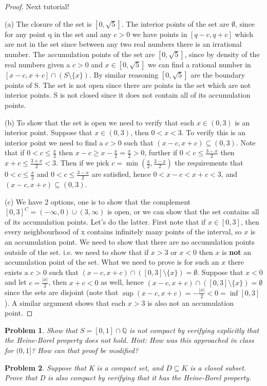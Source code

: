 \documentclass[11pt]{article}
\theoremstyle{plain}
\newtheorem{problem}{Problem}
\theoremstyle{remark}
\newcommand {\mbQ} {\mathbb Q}
\begin{document}
	\begin{proof}
		
		Next tutorial!
		
	
		(a) The closure of the set is $[0, \sqrt 5]$. The interior points of the set are $\emptyset$, since for any point q in the set and any $c>0$ we have points in $[q-c,q+c]$ which are not in the set since between any two real numbers there is an irrational number. The accumulation points of the set are $[0,\sqrt 5]$, since by density of the real numbers given a $c>0$ and $x\in [0,\sqrt 5]$ we can find a rational number in $[x-c,x+c]\cap (S\setminus \{x\})$. By similar reasoning $[0,\sqrt 5]$ are the boundary points of S. The set is not open since there are points in the set which are not interior points. S is not closed since it does not contain all of its accumulation points.
		
		(b) To show that the set is open we need to verify that each $x\in (0,3)$ is an interior point. Suppose that $x\in (0,3)$, then $0<x<3$. To verify this is an interior point we need to find a $c>0$ such that $(x-c,x+c)\subseteq (0,3)$. Note that if $0<c\leq\frac x 2$ then $x-c\geq x - \frac x 2 = \frac x 2 >0$, further if $0<c\leq \frac {3-x} 2$ then $x+c\leq \frac {3+x} 2 < 3$. Then if we pick $c=\min (\frac x 2, \frac {3-x}2)$ the requirements that $0<c\leq \frac x 2$ and $0<c\leq \frac {3-x} 2$ are satisfied, hence $0<x-c<x+c<3$, and $(x-c,x+c)\subseteq (0,3)$.
		
		(c) We have 2 options, one is to show that the complement $[0,3]^C = (-\infty,0)\cup (3,\infty)$ is open, or we can show that the set contains all of its accumulation points. Let's do the latter. First note that if $x\in [0,3]$, then every neighbourhood of x contains infinitely many points of the interval, so $x$ is an accumulation point. We need to show that there are no accumulation points outside of the set. i.e. we need to show that if $x>3$ or $x<0$ then $x$ is \textbf{not} an accumulation point of the set. What we need to prove is for such an $x$ there exists a $c>0$ such that $(x-c,x+c)\cap ([0,3]\setminus \{x\})=\emptyset$. Suppose that $x<0$ and let $c=\frac{|x|}{2}$, then $x+c<0$ as well, hence $(x-c,x+c)\cap ([0,3]\setminus \{x\})=\emptyset$ since the sets are disjoint (note that $\sup (x-c,x+c)=-\frac{|x|}{2}< 0=\inf [0,3]$). A similar argument shows that each $x>3$ is also not an accumulation point.
		
		
	\end{proof}
\fi
	\begin{problem}
		Show that $S=[0,1]\cap \mbQ$ is not compact by verifying explicitly that the Heine-Borel property does not hold. Hint: How was this approached in class for $(0,1]$? How can that proof be modified?
	\end{problem}

	\begin{problem}
	Suppose that K is a compact set, and $D\subseteq K$ is a closed subset. Prove that D is also compact by verifying that it has the Heine-Borel property.
	\end{problem}
	
\end{document}
